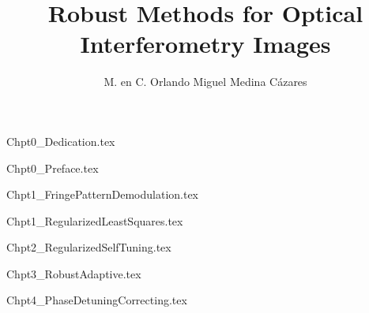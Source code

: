 \documentclass[letterpaper,12pt]{book}
\title{Robust Methods for Optical Interferometry Images}
\author{M. en C. Orlando Miguel Medina C\'azares}
\begin{document}
\maketitle

\clearpage
\thispagestyle{empty}

\tableofcontents
{}
\listoffigures

\clearpage

\mainmatter

{Chpt0_Dedication.tex}

{Chpt0_Preface.tex}

{Chpt1_FringePatternDemodulation.tex}

{Chpt1_RegularizedLeastSquares.tex}

{Chpt2_RegularizedSelfTuning.tex}

{Chpt3_RobustAdaptive.tex}

{Chpt4_PhaseDetuningCorrecting.tex}


\medskip

\end{document}
